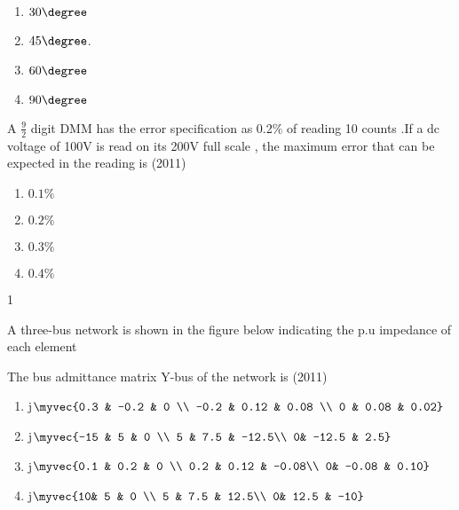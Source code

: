             \begin{enumerate}
             \item $30\degree$
\item $45\degree$.
\item  $60\degree$
\item $90\degree$            \end{enumerate}



      


\item A $\frac{9}{2}$ digit DMM has the error specification as 0.2\% of reading 10 counts .If a dc voltage of 100V is read on its 200V full scale , the maximum error that can be expected  in the reading is \hfill{(2011)}
		\begin{multicols}{4}
			\begin{enumerate}
	\item $0.1 \%$
\item $0.2 \%$
\item $0.3 \%$
\item $0.4 \%$

	\end{enumerate}
		\end{multicols}{1}

 
    \item A three-bus network is shown in the figure below indicating the p.u impedance of each element
    
     
    \newpage
		The bus admittance matrix Y-bus of the network is \hfill{(2011)}
			\begin{enumerate}
				
	\item j$\myvec{0.3 & -0.2 & 0 \\ -0.2 & 0.12 & 0.08 \\ 0 & 0.08 & 0.02}$
\item j$\myvec{-15 & 5 & 0 \\ 5 & 7.5 & -12.5\\ 0& -12.5 & 2.5}$
\item j$\myvec{0.1 & 0.2 & 0 \\ 0.2 & 0.12 & -0.08\\ 0& -0.08 & 0.10}$
\item j$\myvec{10& 5 & 0 \\ 5 & 7.5 & 12.5\\ 0& 12.5 & -10}$
			\end{enumerate}
		



